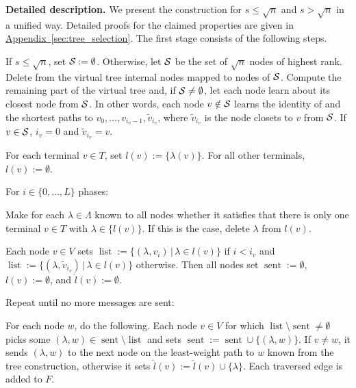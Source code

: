 \documentclass[letterpaper,11pt]{article}
\newcommand{\namedref}[2]{\hyperref[#2]{#1~\ref*{#2}}}
\newcommand{\appendixref}[1]{\namedref{Appendix}{#1}}
\newcommand{\Comp}{\lambda}
\DeclareMathOperator{\sent}{sent}
\DeclareMathOperator{\unsent}{list}
\renewcommand{\paragraph}[1]{\smallskip\par\noindent\textbf{#1}}
\begin{document}
\paragraph{Detailed description.}
We present the construction for $s\leq \sqrt{n}$ and $s>\sqrt{n}$ in a unified
way. Detailed proofs for the claimed properties are given in
\appendixref{sec:tree_selection}. The first stage consists of the following
steps.
\begin{compactenum}
  \item If $s\leq \sqrt{n}$, set ${\cal S}:=\emptyset$. Otherwise, let ${\cal
  S}$ be the set of $\sqrt{n}$ nodes of highest rank. Delete from the virtual
  tree internal nodes mapped to nodes of $\cal S$. Compute the remaining part of
  the virtual tree and, if ${\cal S}\neq \emptyset$, let each node learn about
  its closest node from ${\cal S}$. In other words, each node 
  $v\notin {\cal S}$ learns the identity of and the shortest paths to
  $v_0,\ldots,v_{i_v-1},\tilde{v}_{i_v}$, where $\tilde{v}_{i_v}$ is
  the node closets to $v$ from $\cal S$. If $v\in {\cal S}$, $i_v=0$ and
  $\tilde{v}_{i_v}=v$.
  \item For each terminal $v\in T$, set $l(v):=\{\Comp(v)\}$. For all other
  terminals, $l(v):=\emptyset$.
  \item For $i\in \{0,\ldots,L\}$ phases:
  \begin{compactenum}
    \item Make for each $\Comp \in \Lambda$ known to all nodes whether it
    satisfies that there is only one terminal $v\in T$ with $\Comp\in\{l(v)\}$.
    If this is the case, delete $\Comp$ from $l(v)$.
    \item Each node $v\in V$ sets
    $\unsent:=\{(\Comp,v_i)\,|\,\Comp \in l(v)\}$ if $i<i_v$ and
    $\unsent:=\{(\Comp,\tilde{v}_{i_v})\,|\,\Comp \in l(v)\}$ otherwise. Then
    all nodes set $\sent:=\emptyset$, $l(v):=\emptyset$, and
    $\hat{l}(v):=\emptyset$.
    \item Repeat until no more messages are sent:
    \begin{compactitem}
      \item For each node $w$, do the following. Each node $v\in V$ for which
      $\unsent\setminus \sent\neq \emptyset$ picks some $(\Comp,w)\in
      \sent\setminus \unsent$ and sets $\sent:=\sent \cup \{(\Comp,w)\}$. If
      $v\neq w$, it sends $(\Comp,w)$ to the next node on the least-weight path
      to $w$ known from the tree construction, otherwise it sets
      $\hat{l}(v):=\hat{l}(v) \cup \{\Comp\}$.
      Each traversed edge is added to $F$.

\end{compactitem}
\end{compactenum}
\end{compactenum}
\end{document}
